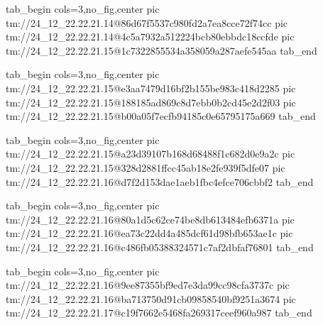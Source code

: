  
 
 
 
 

\qqSecCmtScr


\ifcmt
  tab_begin cols=3,no_fig,center
    pic tm://24_12_22.22.21.14@86d67f5537c980fd2a7ea8cce72f74cc
    pic tm://24_12_22.22.21.14@4c5a7932a512224bcb80ebbdc18ccfde
    pic tm://24_12_22.22.21.15@1c7322855534a358059a287aefe545aa
  tab_end
\fi


\ifcmt
  tab_begin cols=3,no_fig,center
    pic tm://24_12_22.22.21.15@e3aa7479d16bf2b155be983c418d2285
    pic tm://24_12_22.22.21.15@188185ad869c8d7ebb0b2cd45e2d2f03
    pic tm://24_12_22.22.21.15@b00a05f7ecfb94185c0e65795175a669
  tab_end
\fi


\ifcmt
  tab_begin cols=3,no_fig,center
    pic tm://24_12_22.22.21.15@a23d39107b168d68488f1c682d0e9a2c
    pic tm://24_12_22.22.21.15@328d2881ffcc45ab18e2fe939f5dfe07
    pic tm://24_12_22.22.21.16@d7f2d153dae1aeb1fbc4efce706cbbf2
  tab_end
\fi


\ifcmt
  tab_begin cols=3,no_fig,center
    pic tm://24_12_22.22.21.16@80a1d5c62ce74be8db613484efb6371a
    pic tm://24_12_22.22.21.16@ea73c22dd4a485dcf61d98bfb653ae1c
    pic tm://24_12_22.22.21.16@c486fb05388324571c7af2dbfaf76801
  tab_end
\fi


\ifcmt
  tab_begin cols=3,no_fig,center
    pic tm://24_12_22.22.21.16@9ee87355bf9ed7e3da99cc98cfa3737c
    pic tm://24_12_22.22.21.16@ba713750d91cb09858540bf9251a3674
    pic tm://24_12_22.22.21.17@c19f7662e5468fa269317ceef960a987
  tab_end
\fi

